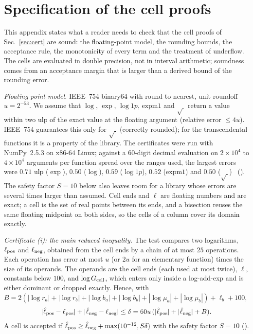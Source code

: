 \section{Specification of the cell proofs}
\label{app:cells}

This appendix states what a reader needs to check that the cell proofs of Sec.~\ref{sec:cert} are sound: the floating-point model, the rounding bounds, the acceptance rule, the monotonicity of every term and the treatment of underflow.
The cells are evaluated in double precision, not in interval arithmetic; soundness comes from an acceptance margin that is larger than a derived bound of the rounding error.

\emph{Floating-point model.}
IEEE~754 binary64 with round to nearest, unit roundoff $u=2^{-53}$.
We assume that $\log$, $\exp$, $\log1p$, $\mathrm{expm1}$ and $\sqrt{\ }$ return a value within two ulp of the exact value at the floating argument (relative error $\le4u$).
IEEE~754 guarantees this only for $\sqrt{\ }$ (correctly rounded); for the transcendental functions it is a property of the library.
The certificates were run with NumPy~2.5.3 on x86-64 Linux; against a 60-digit decimal evaluation on $2\times10^4$ to $4\times10^4$ arguments per function spread over the ranges used, the largest errors were $0.71$ ulp ($\exp$), $0.50$ ($\log$), $0.59$ ($\log1p$), $0.52$ ($\mathrm{expm1}$) and $0.50$ ($\sqrt{\ }$) \numst\ ().
The safety factor $S=10$ below also leaves room for a library whose errors are several times larger than assumed.
Cell ends and $\ell$ are floating numbers and are exact; a cell is the set of real points between its ends, and a bisection reuses the same floating midpoint on both sides, so the cells of a column cover its domain exactly.

\emph{Certificate (i): the main reduced inequality.}
The test compares two logarithms, $\ell_{\rm pos}$ and $\ell_{\rm neg}$, obtained from the cell ends by a chain of at most $25$ operations.
Each operation has error at most $u$ (or $2u$ for an elementary function) times the size of its operands.
The operands are the cell ends (each used at most twice), $\ell$, constants below $100$, and $\log G_{\rm cell}$, which enters only inside a log-add-exp and is either dominant or dropped exactly.
Hence, with $B=2(|\log r_a|+|\log r_b|+|\log b_a|+|\log b_b|+|\log\mu_a|+|\log\mu_b|)+\ell_b+100$,
\begin{equation}
|\hat\ell_{\rm pos}-\ell_{\rm pos}|+|\hat\ell_{\rm neg}-\ell_{\rm neg}|\le\delta=60u\,(|\hat\ell_{\rm pos}|+|\hat\ell_{\rm neg}|+B).
\end{equation}
A cell is accepted if $\hat\ell_{\rm pos}\ge\hat\ell_{\rm neg}+\max(10^{-12},S\delta)$ with the safety factor $S=10$ ().

